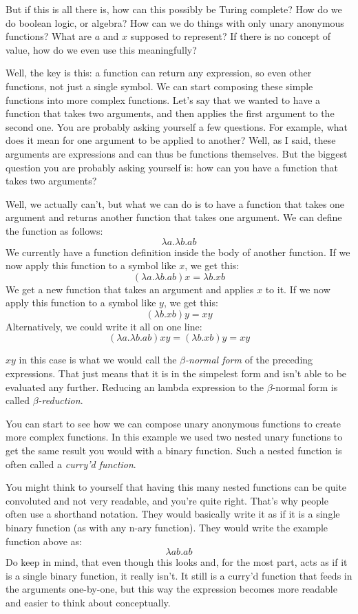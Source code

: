 \documentclass[a4paper]{article}
\begin{document}
But if this is all there is, how can this possibly be Turing complete? How do
we do boolean logic, or algebra? How can we do things with only unary anonymous
functions? What are \(a\) and \(x\) supposed to represent? If there is no
concept of value, how do we even use this meaningfully?

Well, the key is this: a function can return any expression, so even other
functions, not just a single symbol. We can start composing these simple
functions into more complex functions. Let's say that we wanted to have a
function that takes two arguments, and then applies the first argument to the
second one. You are probably asking yourself a few questions. For example, what
does it mean for one argument to be applied to another? Well, as I said, these
arguments are expressions and can thus be functions themselves. But the biggest
question you are probably asking yourself is: how can you have a function that
takes two arguments?

Well, we actually can't, but what we can do is to have a function that takes
one argument and returns another function that takes one argument. We can
define the function as follows:
\[\lambda a.\lambda b.ab\]
We currently have a function definition inside the body of another function. If
we now apply this function to a symbol like \(x\), we get this:
\[(\lambda a.\lambda b.ab)x=\lambda b.xb\]
We get a new function that takes an argument and applies \(x\) to it. If we now
apply this function to a symbol like \(y\), we get this:
\[(\lambda b.xb)y=xy\]
Alternatively, we could write it all on one line:
\[(\lambda a.\lambda b.ab)xy=(\lambda b.xb)y=xy\]

\(xy\) in this case is what we would call the \emph{\(\beta\)-normal form} of
the preceding expressions. That just means that it is in the simpelest form and
isn't able to be evaluated any further. Reducing an lambda expression to the
\(\beta\)-normal form is called \emph{\(\beta\)-reduction}.

You can start to see how we can compose unary anonymous functions to create
more complex functions. In this example we used two nested unary functions to
get the same result you would with a binary function. Such a nested function is
often called a \emph{curry'd function}.

You might think to yourself that having this many nested functions can be quite
convoluted and not very readable, and you're quite right. That's why people
often use a shorthand notation. They would basically write it as if it is a
single binary function (as with any n-ary function). They would write the
example function above as:
\[\lambda ab.ab\]
Do keep in mind, that even though this looks and, for the most part, acts as if
it is a single binary function, it really isn't. It still is a curry'd function
that feeds in the arguments one-by-one, but this way the expression becomes
more readable and easier to think about conceptually.
\end{document}
